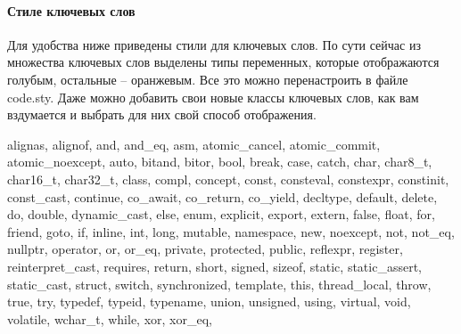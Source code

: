 \documentclass{article}
\begin{document}
\paragraph{Стиле ключевых слов}

Для удобства ниже приведены стили для ключевых слов. По сути сейчас из множества ключевых слов выделены типы переменных, которые отображаются голубым, остальные -- оранжевым. Все это можно перенастроить в файле code.sty. Даже можно добавить свои новые классы ключевых слов, как вам вздумается и выбрать для них свой способ отображения.
\begin{cppcode}
alignas,
alignof,
and,
and_eq,
asm,
atomic_cancel,
atomic_commit,
atomic_noexcept,
auto,
bitand,
bitor,
bool,
break,
case,
catch,
char,
char8_t,
char16_t,
char32_t,
class,
compl,
concept,
const,
consteval,
constexpr,
constinit,
const_cast,
continue,
co_await,
co_return,
co_yield,
decltype,
default,
delete,
do,
double,
dynamic_cast,
else,
enum,
explicit,
export,
extern,
false,
float,
for,
friend,
goto,
if,
inline,
int,
long,
mutable,
namespace,
new,
noexcept,
not,
not_eq,
nullptr,
operator,
or,
or_eq,
private,
protected,
public,
reflexpr,
register,
reinterpret_cast,
requires,
return,
short,
signed,
sizeof,
static,
static_assert,
static_cast,
struct,
switch,
synchronized,
template,
this,
thread_local,
throw,
true,
try,
typedef,
typeid,
typename,
union,
unsigned,
using,
virtual,
void,
volatile,
wchar_t,
while,
xor,
xor_eq,
\end{cppcode}


\end{document}
